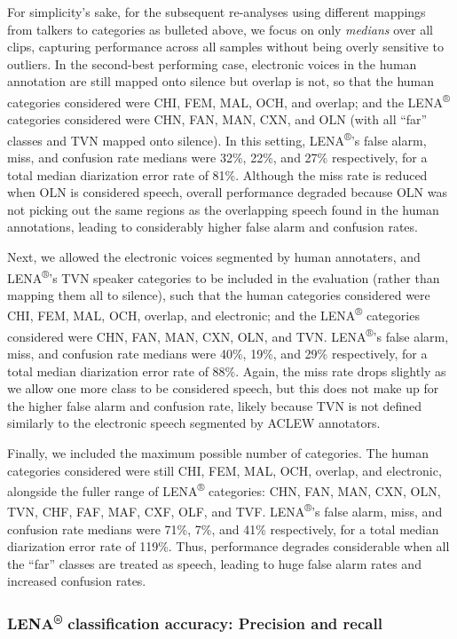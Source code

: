 \documentclass[english,floatsintext,man]{apa6}
\begin{document}
For simplicity's sake, for the subsequent re-analyses using different
mappings from talkers to categories as bulleted above, we focus on only
\emph{medians} over all clips, capturing performance across all samples
without being overly sensitive to outliers. In the second-best
performing case, electronic voices in the human annotation are still
mapped onto silence but overlap is not, so that the human categories
considered were CHI, FEM, MAL, OCH, and overlap; and the
LENA\textsuperscript{®} categories considered were CHN, FAN, MAN, CXN,
and OLN (with all \enquote{far} classes and TVN mapped onto silence). In
this setting, LENA\textsuperscript{®}'s false alarm, miss, and confusion
rate medians were 32\%, 22\%, and 27\% respectively, for a total median
diarization error rate of 81\%. Although the miss rate is reduced when
OLN is considered speech, overall performance degraded because OLN was
not picking out the same regions as the overlapping speech found in the
human annotations, leading to considerably higher false alarm and
confusion rates.

Next, we allowed the electronic voices segmented by human annotaters,
and LENA\textsuperscript{®}'s TVN speaker categories to be included in
the evaluation (rather than mapping them all to silence), such that the
human categories considered were CHI, FEM, MAL, OCH, overlap, and
electronic; and the LENA\textsuperscript{®} categories considered were
CHN, FAN, MAN, CXN, OLN, and TVN. LENA\textsuperscript{®}'s false alarm,
miss, and confusion rate medians were 40\%, 19\%, and 29\% respectively,
for a total median diarization error rate of 88\%. Again, the miss rate
drops slightly as we allow one more class to be considered speech, but
this does not make up for the higher false alarm and confusion rate,
likely because TVN is not defined similarly to the electronic speech
segmented by ACLEW annotators.

Finally, we included the maximum possible number of categories. The
human categories considered were still CHI, FEM, MAL, OCH, overlap, and
electronic, alongside the fuller range of LENA\textsuperscript{®}
categories: CHN, FAN, MAN, CXN, OLN, TVN, CHF, FAF, MAF, CXF, OLF, and
TVF. LENA\textsuperscript{®}'s false alarm, miss, and confusion rate
medians were 71\%, 7\%, and 41\% respectively, for a total median
diarization error rate of 119\%. Thus, performance degrades considerable
when all the \enquote{far} classes are treated as speech, leading to
huge false alarm rates and increased confusion rates.

\subsubsection{\texorpdfstring{LENA\textsuperscript{®} classification
accuracy: Precision and
recall}{LENA® classification accuracy: Precision and recall}}\label{lena-classification-accuracy-precision-and-recall}
\end{document}
